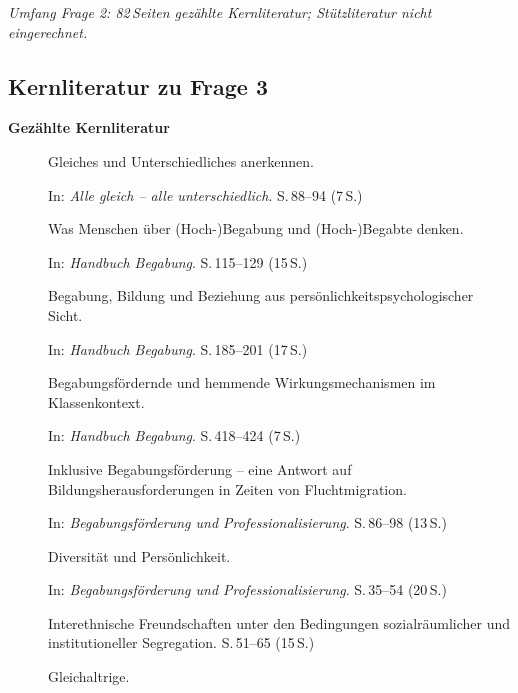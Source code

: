 \textit{Umfang Frage 2: 82\,Seiten gezählte Kernliteratur; Stützliteratur nicht eingerechnet.}


\subsection{Kernliteratur zu Frage 3}

\textbf{Gezählte Kernliteratur}

\begin{description}
  \item[\cite{grossrieder2010anerkennung}] Gleiches und Unterschiedliches anerkennen.
    
    In: \textit{Alle gleich -- alle unterschiedlich}.
    S.\,88--94 (7\,S.)

  \item[\cite{baudson2021wasdenken}] Was Menschen über (Hoch-)Begabung und (Hoch-)Begabte denken.
    
    In: \textit{Handbuch Begabung}.
    S.\,115--129 (15\,S.)

  \item[\cite{kuhl2021begabungbildungbeziehung}] Begabung, Bildung und Beziehung aus persönlichkeitspsychologischer Sicht.
    
    In: \textit{Handbuch Begabung}.
    S.\,185--201 (17\,S.)

  \item[\cite{wagener2021bfhemmendfoerdernd}] Begabungsfördernde und hemmende Wirkungsmechanismen im Klassenkontext.
    
    In: \textit{Handbuch Begabung}.
    S.\,418--424 (7\,S.)

  \item[\cite{behrensen2019inklusive}] Inklusive Begabungsförderung -- eine Antwort auf Bildungsherausforderungen in Zeiten von Fluchtmigration.
    
    In: \textit{Begabungsförderung und Professionalisierung}.
    S.\,86--98 (13\,S.)

  \item[\cite{kuhl2019diversitaet}] Diversität und Persönlichkeit.
    
    In: \textit{Begabungsförderung und Professionalisierung}.
    S.\,35--54 (20\,S.)

  \item[\cite{boosnuenning2022interethnisch}] Interethnische Freundschaften unter den Bedingungen sozialräumlicher und institutioneller Segregation.
    S.\,51--65 (15\,S.)

  \item[\cite{kesselshannover2015gleichaltrige}] Gleichaltrige.
    

\end{description}
